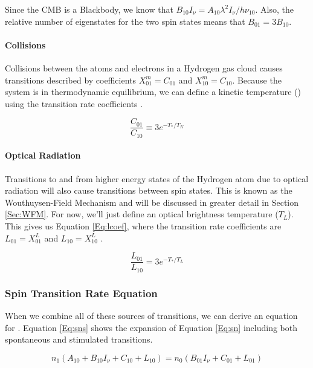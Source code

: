 Since the CMB is a Blackbody, we know that $B_{10} I_{\nu} = A_{10} \lambda^2 I_{\nu}/ h \nu_{10}$. Also, the relative number of eigenstates for the two spin states means that $B_{01} = 3 B_{10}$. 


\paragraph{Collisions}

Collisions between the atoms and electrons in a Hydrogen gas cloud causes transitions described by coefficients $X^m_{01} = C_{01}$ and $X^m_{10} = C_{10}$. Because the system is in thermodynamic equilibrium, we can define a kinetic temperature (\tk) using the transition rate coefficients \cite{field_1958}. 

\begin{equation}
\frac{C_{01}}{C_{10}} \equiv 3 e^{-T_*/T_K}
\end{equation}

\paragraph{Optical Radiation}

Transitions to and from higher energy states  of the Hydrogen atom due to optical radiation will also cause transitions between spin states. This is known as the Wouthuysen-Field Mechanism \cite{wouthuysen_1952}\cite{field_1958} and will be discussed in greater detail in Section \ref{Sec:WFM}. For now, we'll just define an optical brightness temperature ($T_L$). This gives us Equation \ref{Eq:lcoef}, where the transition rate coefficients are $L_{01} = X^L_{01}$ and $L_{10} = X^L_{10}$ \cite{field_1958}. 

\begin{equation} \label{Eq:lcoef}
\frac{L_{01}}{L_{10}} = 3 e^{-T_*/T_L}
\end{equation}

\subsubsection{Spin Transition Rate Equation}

When we combine all of these sources of transitions, we can derive an equation for \ts. Equation \ref{Eq:sns} shows the expansion of Equation \ref{Eq:sn} including both spontaneous and stimulated transitions. 

\begin{equation}\label{Eq:sns}
n_1(A_{10} + B_{10} I_\nu + C_{10} + L_{10}) = n_0 (B_{01} I_\nu + C_{01} + L_{01})
\end{equation}

